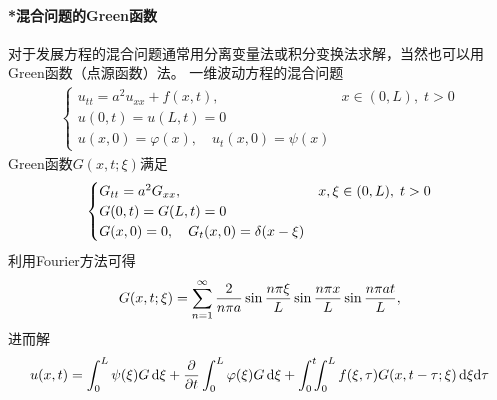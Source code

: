 \paragraph*{*混合问题的Green函数}对于发展方程的混合问题通常用分离变量法或积分变换法求解，当然也可以用Green函数（点源函数）法。
\eg 一维波动方程的混合问题
\begin{align*}
	\begin{cases}
		u_{tt}=a^2u_{xx}+f(x,t),&x\in(0,L),\;t>0\\
		u(0,t)=u(L,t)=0\\
		u(x,0)=\varphi(x),\quad u_t(x,0)=\psi(x)
	\end{cases}
\end{align*}
Green函数$G(x,t;\xi)$满足 
\begin{align*}
	\begin{cases}
		G_{tt}=a^2G_{xx},&x,\xi\in(0,L),\;t>0\\
		G(0,t)=G(L,t)=0\\
		G(x,0)=0,\quad G_t(x,0)=\mathop{}\!\delta(x-\xi)
	\end{cases}
\end{align*}
利用Fourier方法可得
\[
	G(x,t;\xi)=\sum_{n=1}^{\infty}\frac2{n\pi a}\sin\frac{n\pi\xi}L\sin\frac{n\pi x}L\sin\frac{n\pi at}L,
\]
进而解
\begin{align}
	u(x,t)=\int_0^L\psi(\xi)G\d\xi+\pp t\int_0^L\varphi(\xi)G\d\xi+\int_0^t\bs4\int_0^L f(\xi,\tau)G(x,t-\tau;\xi)\d\xi\nd\tau
\end{align}


